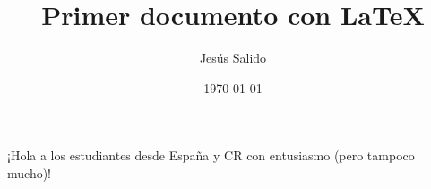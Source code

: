 \documentclass{article}
\title{Primer documento con \LaTeX}
\author{Jesús Salido}
\date{\today}
\begin{document}
\maketitle

¡Hola a los estudiantes desde      España y CR con entusiasmo (pero tampoco 
mucho)!
\end{document}
